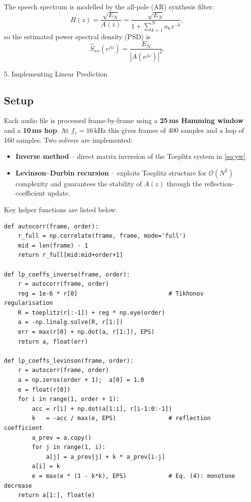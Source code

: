 \documentclass[12pt,a4paper,onecolumn]{exam}
\newcommand{\questionheader}[1]{%
  \begin{tcolorbox}[
    enhanced,
    colback=black,
    coltext=white,
    boxrule=0pt,
    fontupper=\Large\bfseries,
    arc=4mm
  ]
  #1
  \end{tcolorbox}%
}
\begin{document}
The speech spectrum is modelled by the all-pole (AR) synthesis filter:
\begin{equation}
  H(z) = \frac{\sqrt{E_N}}{A(z)} = \frac{\sqrt{E_N}}{1+\sum_{k=1}^N a_k z^{-k}},
  \label{eq:synth}
\end{equation}
so the estimated power spectral density (PSD) is
\begin{equation}
  \hat{S}_{xx}(e^{j\omega}) = \frac{E_N}{|A(e^{j\omega})|^2}.
  \label{eq:arpsd}
\end{equation}

\questionheader{5. Implementing Linear Prediction}

\subsection*{Setup}
Each audio file is processed frame-by-frame using a \textbf{25\,ms Hamming window}
and a \textbf{10\,ms hop}. At $f_s = 16\,\text{kHz}$ this gives frames of
400 samples and a hop of 160 samples.
Two solvers are implemented:
\begin{itemize}
  \item \textbf{Inverse method} -- direct matrix inversion of the
        Toeplitz system in \eqref{eq:yw}.
  \item \textbf{Levinson--Durbin recursion} -- exploits Toeplitz structure
        for $\mathcal{O}(N^2)$ complexity and guarantees the stability
        of $A(z)$ through the reflection-coefficient update.
\end{itemize}

\medskip
Key helper functions are listed below.

\begin{lstlisting}[caption={Autocorrelation and LP coefficient solvers}]
def autocorr(frame, order):
    r_full = np.correlate(frame, frame, mode='full')
    mid = len(frame) - 1
    return r_full[mid:mid+order+1]

def lp_coeffs_inverse(frame, order):
    r = autocorr(frame, order)
    reg = 1e-6 * r[0]                          # Tikhonov regularisation
    R = toeplitz(r[:-1]) + reg * np.eye(order)
    a = -np.linalg.solve(R, r[1:])
    err = max(r[0] + np.dot(a, r[1:]), EPS)
    return a, float(err)

def lp_coeffs_levinson(frame, order):
    r = autocorr(frame, order)
    a = np.zeros(order + 1);  a[0] = 1.0
    e = float(r[0])
    for i in range(1, order + 1):
        acc = r[i] + np.dot(a[1:i], r[i-1:0:-1])
        k   = -acc / max(e, EPS)               # reflection coefficient
        a_prev = a.copy()
        for j in range(1, i):
            a[j] = a_prev[j] + k * a_prev[i-j]
        a[i] = k
        e = max(e * (1 - k*k), EPS)            # Eq. (4): monotone decrease
    return a[1:], float(e)
\end{lstlisting}
\end{document}
